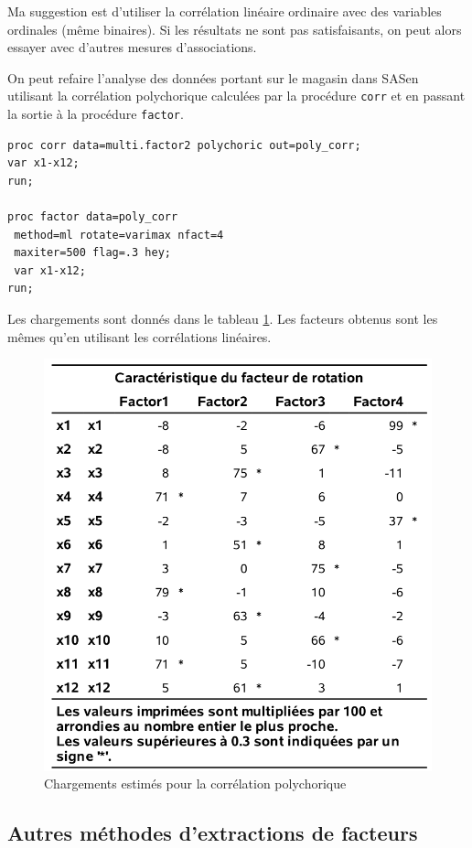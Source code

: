 \documentclass[
]{book}
\theoremstyle{definition}
\theoremstyle{definition}
\theoremstyle{definition}
\theoremstyle{remark}
\begin{document}
Ma suggestion est d'utiliser la corrélation linéaire ordinaire avec des variables ordinales (même binaires). Si les résultats ne sont pas satisfaisants, on peut alors essayer avec d'autres mesures d'associations.

On peut refaire l'analyse des données portant sur le magasin dans \textsf{SAS}en utilisant la corrélation polychorique calculées par la procédure \texttt{corr} et en passant la sortie à la procédure \texttt{factor}.

\begin{verbatim}
proc corr data=multi.factor2 polychoric out=poly_corr;
var x1-x12;
run;

proc factor data=poly_corr
 method=ml rotate=varimax nfact=4
 maxiter=500 flag=.3 hey;
 var x1-x12;
run;
\end{verbatim}

Les chargements sont donnés dans le tableau \ref{fig:fig1p12}. Les facteurs obtenus sont les mêmes qu'en utilisant les corrélations linéaires.

\begin{figure}

{\centering \includegraphics[width=0.65\linewidth]{figures/01-facto-e12} 

}

\caption{Chargements estimés pour la corrélation polychorique}\label{fig:fig1p12}
\end{figure}

\hypertarget{autres-muxe9thodes-dextractions-de-facteurs}{%
\subsection{Autres méthodes d'extractions de facteurs}\label{autres-muxe9thodes-dextractions-de-facteurs}}
\end{document}
